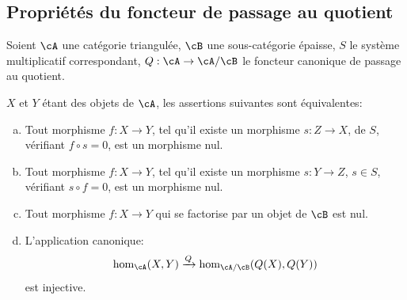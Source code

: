 \subsection{Propriétés du foncteur de passage au quotient}\label{VIII:2-5}

Soient $\cA$ une catégorie triangulée, $\cB$ une sous-catégorie épaisse, 
$S$ le système multiplicatif correspondant, $Q:\cA\to \cA/\cB$ le foncteur 
canonique de passage au quotient. 





\begin{proposition}\label{VIII:2-5-1}
$X$ et $Y$ étant des objets de $\cA$, les assertions suivantes sont 
équivalentes: 
\begin{enumerate}[(a)]
  \item Tout morphisme $f:X\to Y$, tel qu'il existe un morphisme $s:Z\to X$, de 
    $S$, vérifiant $f\circ s=0$, est un morphisme nul.
  \item Tout morphisme $f:X\to Y$, tel qu'il existe un morphisme $s:Y\to Z$, 
    $s\in S$, vérifiant $s\circ f=0$, est un morphisme nul. 
  \item Tout morphisme $f:X\to Y$ qui se factorise par un objet de $\cB$ est 
    nul. 
  \item L'application canonique: 
    \[
      \hom_\cA(X,Y) \xrightarrow{Q} \hom_{\cA/\cB}(Q(X),Q(Y))
    \]
    est injective. 
\end{enumerate}
\end{proposition}





